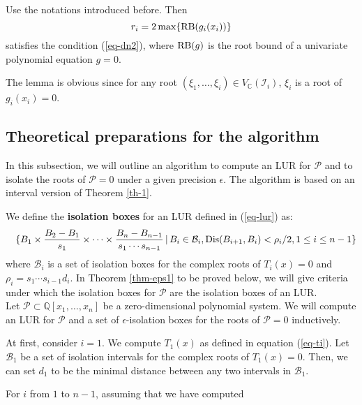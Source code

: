 \documentclass[amsthm]{JSC_LaTex_2007_Mar_12/elsart}
\def\bref#1{(\ref{#1})}
\def\C{{\mathbb{C}}}
\def\Q{{\mathbb{Q}}}
\def\PS{ {\mathcal{P}} }
\def\IS{{\mathcal{I}}}
\def\RB{\hbox{\rm{RB}}}
\def\Dis{\hbox{\rm{Dis}}}
\begin{document}
\begin{lem}\label{lm-rb1}
Use the notations introduced before. Then
\begin{equation}\label{eq-rb2}
r_{i} = 2\max \{\RB(g_{i}(x_{i}))
\}
\end{equation}
satisfies the condition \bref{eq-dn2}, where $\RB(g)$ is the root
bound of a univariate polynomial equation $g=0$.
\end{lem}
\begin{pf}
The lemma is obvious since for any root $(\xi_1,\ldots,\xi_{i})\in
V_{\C}(\IS_{i})$, $\xi_{i}$ is a root of $g_{i}(x_{i})=0$.
\end{pf}


\subsection{Theoretical preparations for the algorithm}

In this subsection, we will outline an algorithm to compute an LUR
for $\PS$ and to isolate the roots of $\PS=0$ under a given
precision $\epsilon$. The algorithm is based on an interval version
of Theorem \ref{th-1}.

We define the {\bf isolation boxes} for an LUR defined in
\bref{eq-lur} as: {\small \begin{eqnarray}\label{eq-ibox} && \{
B_{1}\times\frac{B_{2}-B_{1}}{s_1}\times \cdots\times
\frac{B_{n}-B_{n-1}}{s_1\cdots s_{n-1}}\,|\,
B_i\in \mathcal{B}_i, \Dis(B_{i+1},B_{i}) < \rho_i/2,1\le i\le
n-1\}
\end{eqnarray}}
where $\mathcal{B}_i$ is a set of isolation boxes for the complex
roots of $T_i(x)=0$ and $\rho_i = s_1\cdots s_{i-1}d_i$.
In  Theorem \ref{thm-eps1} to be proved below, we will give criteria
under which the
isolation boxes for $\PS$ are the isolation boxes of an LUR.\\

Let $\PS\subset\Q[x_1,\ldots,x_n]$ be a zero-dimensional polynomial
system.
We will compute an LUR for $\mathcal{P}$ and a set of
$\epsilon$-isolation boxes for the roots of $\mathcal{P}=0$
inductively.

At first, consider $i=1$. We compute $T_1(x)$ as defined in equation
\bref{eq-ti}. Let $\mathcal{B}_1$ be a set of isolation intervals
for the complex roots of $T_1(x)=0$. Then, we can set $d_1$ to be
the minimal distance between any two intervals in $\mathcal{B}_1$.

For $i$ from $1$ to $n-1$, assuming that we have computed
\end{document}
